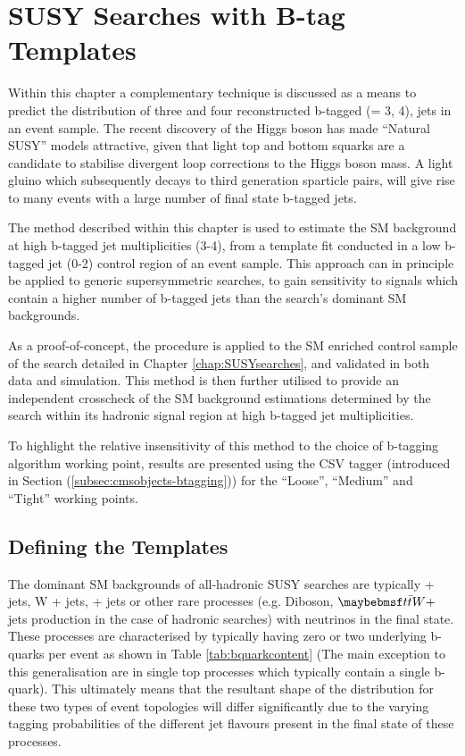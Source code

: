 \chapter{SUSY Searches with B-tag Templates}
\label{chap:templatemethod}


Within this chapter a complementary technique is discussed as a means to predict the distribution of three and four reconstructed b-tagged (\nbreco = 3, 4), jets in an event sample. The recent discovery of the Higgs boson has made ``Natural \ac{SUSY}'' models attractive, given that light top and bottom squarks are a candidate to stabilise divergent loop corrections to the Higgs boson mass. A light gluino which subsequently decays to third generation sparticle pairs, will give rise to many events with a large number of final state b-tagged jets.

The method described within this chapter is used to estimate the \ac{SM} background at high b-tagged jet multiplicities (3-4), from a template fit conducted in a low b-tagged jet (0-2) control region of an event sample. This approach can in principle be applied to generic supersymmetric searches, to gain sensitivity to signals which contain a higher number of b-tagged jets than the search's dominant \ac{SM} backgrounds. 

As a proof-of-concept, the procedure is applied to the \ac{SM} enriched \mupjets control sample of the \alphat search detailed in Chapter \ref{chap:SUSYsearches}, and validated in both data and simulation. This method is then further utilised to provide an independent crosscheck of the \ac{SM} background estimations determined by the \alphat search within its hadronic signal region at high b-tagged jet multiplicities.

To highlight the relative insensitivity of this method to the choice of b-tagging algorithm working point, results are presented using the \ac{CSV} tagger (introduced in Section (\ref{subsec:cmsobjects-btagging})) for the ``Loose'', ``Medium'' and ``Tight'' working points.

\section{Defining the Templates}
\label{sec:templateconcept}

The dominant \ac{SM} backgrounds of all-hadronic \ac{SUSY} searches are typically \ttbar + jets, W + jets, \zinv + jets or other rare processes (e.g. Diboson, $\ttbar W +$ jets production in the case of hadronic searches) with neutrinos in the final state. These processes are characterised by typically having zero or two underlying b-quarks per event as shown in Table \ref{tab:bquarkcontent} (The main exception to this generalisation are in single top processes which typically contain a single b-quark). This ultimately means that the resultant shape of the \nbreco distribution for these two types of event topologies will differ significantly due to the varying tagging probabilities of the different jet flavours present in the final state of these processes.  


